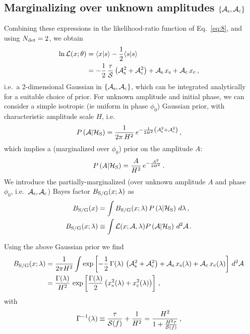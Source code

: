 \documentclass[aps,prd,onecolumn,notitlepage,nofootinbib,superscriptaddress,altaffilletter,floatfix]{revtex4-1}
\begin{document}
\subsection{Marginalizing over unknown amplitudes $\{\mathcal{A}_{\mathrm{s}},\mathcal{A}_{\mathrm{c}}\}$}
\label{sec:marg-over-unkn}

Combining these expressions in the likelihood-ratio function of Eq.~\eqref{eq:8}, and using $N_{\mathrm{det}}=2$, we obtain
\begin{align}
  \label{eq:21}
  \ln \mathcal{L}(x;\theta) &= \langle x|s\rangle - \frac{1}{2}\langle s|s\rangle\\
  &= -\frac{1}{2}\,\frac{\tau}{\mathcal{S}}\left(\mathcal{A}_{\mathrm{s}}^2+\mathcal{A}_{\mathrm{c}}^2\right) + \mathcal{A}_{\mathrm{s}}\,x_{\mathrm{s}} + \mathcal{A}_{\mathrm{c}}\,x_{\mathrm{c}}\,,
\end{align}
i.e.\ a 2-dimensional Gaussian in $\{\mathcal{A}_{\mathrm{s}},\mathcal{A}_{\mathrm{c}}\}$, which can be integrated analytically for a suitable choice of prior.
For unknown amplitude and initial phase, we can consider a simple isotropic (ie uniform in phase $\phi_0$) Gaussian prior, with
characteristic amplitude scale $H$, i.e.\
\begin{equation}
  \label{eq:22}
  P\left(\mathcal{A}|\mathcal{H}_{\mathrm{S}}\right) = \frac{1}{2\pi\,H^2}\,e^{-\frac{1}{2H^2}\left(\mathcal{A}_{\mathrm{s}}^2 + \mathcal{A}_{\mathrm{c}}^2\right)}\,,
\end{equation}
which implies a (marginalized over $\phi_0$) prior on the amplitude $A$:
\begin{equation}
  \label{eq:28}
  P\left(A|\mathcal{H}_{\mathrm{S}}\right) = \frac{A}{H^2}\,e^{-\frac{A^2}{2H^2}}\,.
\end{equation}
We introduce the partially-marginalized (over unknown amplitude $A$ and phase $\phi_0$, i.e.\ $\mathcal{A}_{\mathrm{s}},\mathcal{A}_{\mathrm{c}}$) Bayes factor $B_{\mathrm{S/G}}(x;\lambda)$ as
\begin{align}
  \label{eq:23}
  B_{\mathrm{S/G}}(x) &= \int B_{\mathrm{S/G}}(x;\lambda) \,P\left(\lambda|\mathcal{H}_{\mathrm{S}}\right)\,d\lambda\,,\\
  B_{\mathrm{S/G}}(x;\lambda) &\equiv \int \mathcal{L}(x;\mathcal{A},\lambda)P\left(\mathcal{A}|\mathcal{H}_{\mathrm{S}}\right)\,d^2\mathcal{A}\,.
\end{align}

Using the above Gaussian prior we find
\begin{align}
  \label{eq:29}
  B_{\mathrm{S/G}}(x;\lambda) &= \frac{1}{2\pi H^2}\int \exp\left[-\frac{1}{2}\,\Gamma(\lambda)\,\left(\mathcal{A}_{\mathrm{s}}^2+\mathcal{A}_{\mathrm{c}}^2\right) + \mathcal{A}_{\mathrm{s}}\,x_{\mathrm{s}}(\lambda) + \mathcal{A}_{\mathrm{c}}\,x_{\mathrm{c}}(\lambda)\right]\,d^2\mathcal{A}\\
  &=\frac{\Gamma(\lambda)}{H^2} \, \exp\left[\frac{\Gamma(\lambda)}{2}\left(x_{\mathrm{s}}^2(\lambda) + x_{\mathrm{c}}^2(\lambda)\right)\right]\,,
\end{align}
with
\begin{equation}
  \label{eq:25}
  \Gamma^{-1}(\lambda) \equiv \frac{\tau}{\mathcal{S}(f)} + \frac{1}{H^2} = \frac{H^2}{1 + \frac{H^2\tau}{\mathcal{S}(f)}}\,,
\end{equation}
\end{document}
